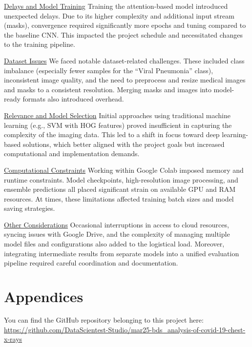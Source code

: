 \documentclass{article}
\begin{document}
\underline{Delays and Model Training}
Training the attention-based model introduced unexpected delays. Due to its higher complexity and additional input stream (masks), convergence required significantly more epochs and tuning compared to the baseline CNN. This impacted the project schedule and necessitated changes to the training pipeline.

\underline{Dataset Issues}
We faced notable dataset-related challenges. These included class imbalance (especially fewer samples for the “Viral Pneumonia” class), inconsistent image quality, and the need to preprocess and resize medical images and masks to a consistent resolution. Merging masks and images into model-ready formats also introduced overhead.

\underline{Relevance and Model Selection}
Initial approaches using traditional machine learning (e.g., SVM with HOG features) proved insufficient in capturing the complexity of the imaging data. This led to a shift in focus toward deep learning-based solutions, which better aligned with the project goals but increased computational and implementation demands.

\underline{Computational Constraints}
Working within Google Colab imposed memory and runtime constraints. Model checkpoints, high-resolution image processing, and ensemble predictions all placed significant strain on available GPU and RAM resources. At times, these limitations affected training batch sizes and model saving strategies.

\underline{Other Considerations}
Occasional interruptions in access to cloud resources, syncing issues with Google Drive, and the complexity of managing multiple model files and configurations also added to the logistical load. Moreover, integrating intermediate results from separate models into a unified evaluation pipeline required careful coordination and documentation.

\newpage

\section{Appendices}

You can find the GitHub repository belonging to this project here: \\
\url{https://github.com/DataScientest-Studio/mar25-bds_analysis-of-covid-19-chest-x-rays}\\




\end{document}
